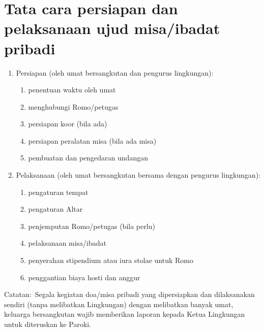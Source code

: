 \section{Tata cara persiapan dan pelaksanaan ujud  misa/ibadat pribadi}
\label{sec:tataCara}
\begin{enumerate}
\item Persiapan (oleh umat bersangkutan dan pengurus lingkungan):

\begin{enumerate}
\item penentuan waktu oleh umat
\item menghubungi Romo/petugas
\item persiapan koor (bila ada)
\item persiapan peralatan misa (bila ada misa)
\item pembuatan dan pengedaran undangan
\end{enumerate}
\item Pelaksanaan (oleh umat bersangkutan bersama dengan pengurus
lingkungan):

\begin{enumerate}
\item pengaturan tempat
\item pengaturan Altar
\item penjemputan Romo/petugas (bila perlu)
\item pelaksanaan misa/ibadat
\item penyerahan stipendium atau iura stolae untuk Romo
\item penggantian biaya hosti dan anggur
\end{enumerate}
\end{enumerate}
Catatan:~Segala kegiatan doa/misa pribadi yang dipersiapkan dan
dilaksanakan sendiri (tanpa melibatkan Lingkungan) dengan melibatkan
banyak umat, keluarga bersangkutan wajib memberikan laporan kepada
Ketua Lingkungan untuk diteruskan ke Paroki.
